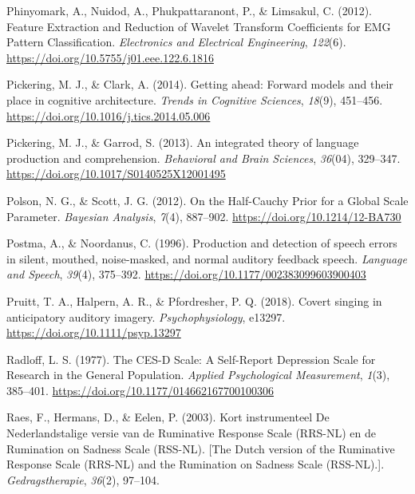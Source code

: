 \documentclass[a4paper,12pt,twoside,onecolumn,openright,final,oldfontcommands]{memoir}
\begin{document}
\leavevmode\hypertarget{ref-phinyomark_feature_2012}{}%
Phinyomark, A., Nuidod, A., Phukpattaranont, P., \& Limsakul, C. (2012). Feature Extraction and Reduction of Wavelet Transform Coefficients for EMG Pattern Classification. \emph{Electronics and Electrical Engineering}, \emph{122}(6). \url{https://doi.org/10.5755/j01.eee.122.6.1816}

\leavevmode\hypertarget{ref-pickering_getting_2014}{}%
Pickering, M. J., \& Clark, A. (2014). Getting ahead: Forward models and their place in cognitive architecture. \emph{Trends in Cognitive Sciences}, \emph{18}(9), 451--456. \url{https://doi.org/10.1016/j.tics.2014.05.006}

\leavevmode\hypertarget{ref-pickering_integrated_2013}{}%
Pickering, M. J., \& Garrod, S. (2013). An integrated theory of language production and comprehension. \emph{Behavioral and Brain Sciences}, \emph{36}(04), 329--347. \url{https://doi.org/10.1017/S0140525X12001495}

\leavevmode\hypertarget{ref-polson_half-cauchy_2012}{}%
Polson, N. G., \& Scott, J. G. (2012). On the Half-Cauchy Prior for a Global Scale Parameter. \emph{Bayesian Analysis}, \emph{7}(4), 887--902. \url{https://doi.org/10.1214/12-BA730}

\leavevmode\hypertarget{ref-postma_production_1996}{}%
Postma, A., \& Noordanus, C. (1996). Production and detection of speech errors in silent, mouthed, noise-masked, and normal auditory feedback speech. \emph{Language and Speech}, \emph{39}(4), 375--392. \url{https://doi.org/10.1177/002383099603900403}

\leavevmode\hypertarget{ref-pruitt_covert_2018}{}%
Pruitt, T. A., Halpern, A. R., \& Pfordresher, P. Q. (2018). Covert singing in anticipatory auditory imagery. \emph{Psychophysiology}, e13297. \url{https://doi.org/10.1111/psyp.13297}

\leavevmode\hypertarget{ref-radloff_ces-d_1977}{}%
Radloff, L. S. (1977). The CES-D Scale: A Self-Report Depression Scale for Research in the General Population. \emph{Applied Psychological Measurement}, \emph{1}(3), 385--401. \url{https://doi.org/10.1177/014662167700100306}

\leavevmode\hypertarget{ref-raes_kort_2003}{}%
Raes, F., Hermans, D., \& Eelen, P. (2003). Kort instrumenteel De Nederlandstalige versie van de Ruminative Response Scale (RRS-NL) en de Rumination on Sadness Scale (RSS-NL). {[}The Dutch version of the Ruminative Response Scale (RRS-NL) and the Rumination on Sadness Scale (RSS-NL).{]}. \emph{Gedragstherapie}, \emph{36}(2), 97--104.
\end{document}
